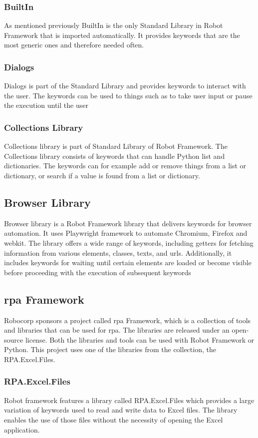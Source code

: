\subsubsection{BuiltIn}
As mentioned previously BuiltIn is the only Standard Library in Robot Framework that is imported automatically.
It provides keywords that are the most generic ones and therefore needed often.
\cite{robotFramework:builtinLibrary}
\subsubsection{Dialogs}
Dialogs is part of the Standard Library and provides keywords to interact with the user. The keywords can be used to things such as to take user input or pause the execution until the user 
\cite{robotFramework:dialogsLibrary}

\subsubsection{Collections Library}
Collections library is part of Standard Library of Robot Framework.
The Collections library consists of keywords that can handle Python list and dictionaries.
The keywords can for example add or remove things from a list or dictionary, or search if a value is found from a list or dictionary.
\cite{robotFramework:collectionsLibrary}

\subsection{Browser Library}
Browser library is a Robot Framework library that delivers keywords for browser automation.
It uses Playwright framework to automate Chromium, Firefox and webkit.
The library offers a wide range of keywords, including getters for fetching information from various elements, classes, texts, and \gls{url}s.
Additionally, it includes keywords for waiting until certain elements are loaded or become visible before proceeding with the execution of subsequent keywords
\cite{robotFramework:browserLibrary}

\subsection{\gls{rpa} Framework}
Robocorp sponsors a  project called \gls{rpa} Framework, which is a collection of tools and libraries that can be used for \gls{rpa}\cite{robotFramwework:rpaFramework}.
The libraries are released under an open-source license.
Both the libraries and tools can be used with Robot Framework or Python.
This project uses one of the libraries from the collection, the RPA.Excel.Files.
\subsubsection{RPA.Excel.Files}
Robot framework features a library called RPA.Excel.Files which provides a large variation of keywords used to read and write data to Excel files.
The library enables the use of those files without the necessity of opening the Excel application.
\cite{rpaFramework:excelFiles}

\clearpage %
